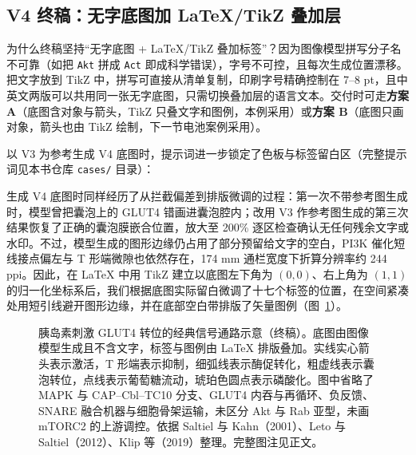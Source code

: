 \subsection{V4 终稿：无字底图加 LaTeX/TikZ 叠加层}

为什么终稿坚持“无字底图 + LaTeX/TikZ 叠加标签”？因为图像模型拼写分子名不可靠（如把 \texttt{Akt} 拼成 \texttt{Act} 即成科学错误），字号不可控，且每次生成位置漂移。把文字放到 TikZ 中，拼写可直接从清单复制，印刷字号精确控制在 7–8 pt，且中英文两版可以共用同一张无字底图，只需切换叠加层的语言文本。交付时可走\textbf{方案 A}（底图含对象与箭头，TikZ 只叠文字和图例，本例采用）或\textbf{方案 B}（底图只画对象，箭头也由 TikZ 绘制，下一节电池案例采用）。

以 V3 为参考生成 V4 底图时，提示词进一步锁定了色板与标签留白区（完整提示词见本书仓库 \texttt{cases/} 目录）：


生成 V4 底图时同样经历了从拦截偏差到排版微调的过程：第一次不带参考图生成时，模型曾把囊泡上的 GLUT4 错画进囊泡腔内；改用 V3 作参考图生成的第三次结果恢复了正确的囊泡膜嵌合位置，放大至 200\% 逐区检查确认无任何残余文字或水印。不过，模型生成的图形边缘仍占用了部分预留给文字的空白，PI3K 催化短线接点偏左与 T 形端微隙也依然存在，174 mm 通栏宽度下折算分辨率约 244 ppi。因此，在 LaTeX 中用 TikZ 建立以底图左下角为 $(0,0)$、右上角为 $(1,1)$ 的归一化坐标系后，我们根据底图实际留白微调了十七个标签的位置，在空间紧凑处用短引线避开图形边缘，并在底部空白带排版了矢量图例（图~\ref{fig:ch07-06}）。

\begin{figure}[htbp]\centering

\caption{胰岛素刺激 GLUT4 转位的经典信号通路示意（终稿）。底图由图像模型生成且不含文字，标签与图例由 LaTeX 排版叠加。实线实心箭头表示激活，T 形端表示抑制，细弧线表示酶促转化，粗虚线表示囊泡转位，点线表示葡萄糖流动，琥珀色圆点表示磷酸化。图中省略了 MAPK 与 CAP–Cbl–TC10 分支、GLUT4 内吞与再循环、负反馈、SNARE 融合机器与细胞骨架运输，未区分 Akt 与 Rab 亚型，未画 mTORC2 的上游调控。依据 Saltiel 与 Kahn（2001）、Leto 与 Saltiel（2012）、Klip 等（2019）整理。完整图注见正文。}\label{fig:ch07-06}
\end{figure}

